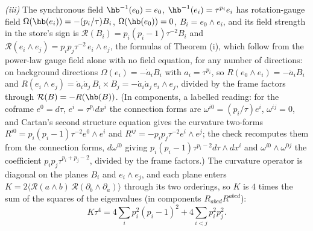 \emph{(iii)} The synchronous field $\hb^{-1}(e_{0}) = e_{0}$, $\hb^{-1}(e_{i}) = \tau^{p_{i}}e_{i}$ has rotation-gauge field $\Omega(\hb(e_{i})) = -(p_{i}/\tau)B_{i}$, $\Omega(\hb(e_{0})) = 0$, $B_{i} = e_{0}\wedge e_{i}$, and its field strength in the store's sign is $\mathcal{R}(B_{i}) = p_{i}(p_{i} - 1)\tau^{-2}B_{i}$ and $\mathcal{R}(e_{i}\wedge e_{j}) = p_{i}p_{j}\tau^{-2}\,e_{i}\wedge e_{j}$, the formulas of Theorem (i), which follow from the power-law gauge field alone with no field equation, for any number of directions: on background directions $\Omega(e_{i}) = -\dot a_{i}B_{i}$ with $a_{i} = \tau^{p_{i}}$, so $R(e_{0}\wedge e_{i}) = -\ddot a_{i}B_{i}$ and $R(e_{i}\wedge e_{j}) = \dot a_{i}\dot a_{j}\,B_{i}\times B_{j} = -\dot a_{i}\dot a_{j}\,e_{i}\wedge e_{j}$, divided by the frame factors through $\mathcal{R}(B) = -R(\hb(B))$. (In components, a labelled reading: for the coframe $e^{0} = d\tau$, $e^{i} = \tau^{p_{i}}dx^{i}$ the connection forms are $\omega^{i0} = (p_{i}/\tau)e^{i}$, $\omega^{ij} = 0$, and Cartan's second structure equation gives the curvature two-forms $R^{i0} = p_{i}(p_{i} - 1)\tau^{-2}e^{0}\wedge e^{i}$ and $R^{ij} = -p_{i}p_{j}\tau^{-2}e^{i}\wedge e^{j}$; the check recomputes them from the connection forms, $d\omega^{i0}$ giving $p_{i}(p_{i} - 1)\tau^{p_{i} - 2}d\tau\wedge dx^{i}$ and $\omega^{i0}\wedge\omega^{0j}$ the coefficient $p_{i}p_{j}\tau^{p_{i} + p_{j} - 2}$, divided by the frame factors.) The curvature operator is diagonal on the planes $B_{i}$ and $e_{i}\wedge e_{j}$, and each plane enters $K = 2\langle\mathcal{R}(a\wedge b)\,\mathcal{R}(\partial_{b}\wedge\partial_{a})\rangle$ through its two orderings, so $K$ is $4$ times the sum of the squares of the eigenvalues (in components $R_{abcd}R^{abcd}$):
\[
K\tau^{4} = 4\sum_{i}p_{i}^{2}(p_{i} - 1)^{2} + 4\sum_{i<j}p_{i}^{2}p_{j}^{2} .
\]
